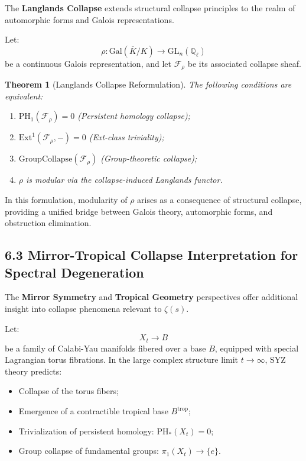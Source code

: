\documentclass[11pt]{article}
\newtheorem{theorem}{Theorem}[section]
\begin{document}
The \textbf{Langlands Collapse} extends structural collapse principles to the realm of automorphic forms and Galois representations.

Let:
\[
\rho : \mathrm{Gal}(\overline{K}/K) \longrightarrow \mathrm{GL}_n(\mathbb{Q}_\ell)
\]
be a continuous Galois representation, and let $\mathcal{F}_\rho$ be its associated collapse sheaf.

\begin{theorem}[Langlands Collapse Reformulation]
The following conditions are equivalent:
\begin{enumerate}
    \item $\mathrm{PH}_1(\mathcal{F}_\rho) = 0$ \quad (Persistent homology collapse);
    \item $\mathrm{Ext}^1(\mathcal{F}_\rho, -) = 0$ \quad (Ext-class triviality);
    \item $\mathrm{GroupCollapse}(\mathcal{F}_\rho)$ \quad (Group-theoretic collapse);
    \item $\rho$ is modular via the collapse-induced Langlands functor.
\end{enumerate}
\end{theorem}


In this formulation, modularity of $\rho$ arises as a consequence of structural collapse, providing a unified bridge between Galois theory, automorphic forms, and obstruction elimination.

\subsection*{6.3 Mirror-Tropical Collapse Interpretation for Spectral Degeneration}

The \textbf{Mirror Symmetry} and \textbf{Tropical Geometry} perspectives offer additional insight into collapse phenomena relevant to $\zeta(s)$.

Let:
\[
X_t \longrightarrow B
\]
be a family of Calabi-Yau manifolds fibered over a base $B$, equipped with special Lagrangian torus fibrations. In the large complex structure limit $t \to \infty$, SYZ theory predicts:

\begin{itemize}
    \item Collapse of the torus fibers;
    \item Emergence of a contractible tropical base $B^{\mathrm{trop}}$;
    \item Trivialization of persistent homology: $\mathrm{PH}_*(X_t) = 0$;
    \item Group collapse of fundamental groups: $\pi_1(X_t) \longrightarrow \{ e \}$.
\end{itemize}
\end{document}
